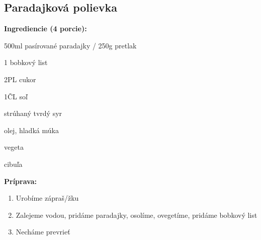 \setcounter{step}{0}

\subsection{ Paradajková polievka }

\begin{ingredient}
  
  \def\portions{  }
  \textbf{ {\normalsize Ingrediencie (4 porcie):} }

  \begin{main}
      \item 500ml pasírované paradajky / 250g pretlak
      \item 1 bobkový list
      \item 2PL cukor
      \item 1ČL soľ
      \item strúhaný tvrdý syr
      \item olej, hladká múka
      \item vegeta
      \item cibuľa
  \end{main}
  
\end{ingredient}
\begin{recipe}
\textbf{ {\normalsize Príprava:} }
\begin{enumerate}

  \item{Urobíme zápraš/žku}
  \item{Zalejeme vodou, pridáme paradajky, osolíme, ovegetíme, pridáme bobkový list}
  \item{Necháme prevrieť}

\end{enumerate}
\end{recipe}

\begin{notes}
  
\end{notes}	
\clearpage
